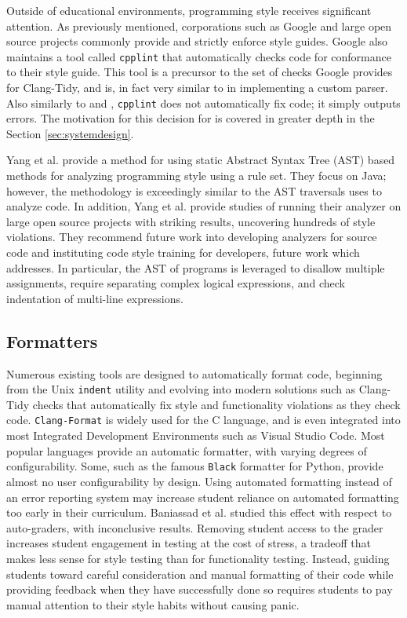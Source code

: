 \documentclass[sigconf]{acmart}
\begin{document}
Outside of educational environments, programming style receives significant attention.
As previously mentioned, corporations such as Google \cite{GoogleCStyleGuide} and large
open source projects commonly provide and strictly enforce style guides. Google also
maintains a tool called \texttt{cpplint} \cite{cpplint} that automatically checks code
for conformance to their style guide. This tool is a precursor to the set of checks
Google provides for Clang-Tidy, and is, in fact very similar to
\oldtool{} in implementing a custom parser. Also similarly to \oldtool{} and \tool{},
\texttt{cpplint} does not automatically fix code; it simply outputs errors. The motivation for
this decision for \tool{} is covered in greater depth in the
Section \ref{sec:systemdesign}.

Yang et al. \cite{10.1145/3297156.3297227} provide a method for using static Abstract Syntax Tree (AST) based methods
for analyzing programming style using a rule set. They focus on Java; however, the
methodology is exceedingly similar to the AST traversals
\tool{} uses to analyze code.
In addition, Yang et al. provide studies of running their analyzer on large open source
projects with striking results, uncovering hundreds of style violations. They recommend
future work into developing analyzers for source code and instituting code style
training for developers, future work which \tool{} addresses. In particular, 
the AST of programs is leveraged to disallow multiple assignments, require
separating complex logical expressions, and check indentation of multi-line expressions.

\subsection{Formatters}

Numerous existing tools are designed to automatically format code, beginning from the
Unix \texttt{indent} utility and evolving into modern solutions such as Clang-Tidy
checks that automatically fix style and functionality violations as they check code. 
\texttt{Clang-Format} \cite{ClangFormat} is widely used for the C language, and is even integrated into most
Integrated Development Environments such as Visual Studio Code. Most popular languages
provide an automatic formatter, with varying degrees of configurability. Some, such as the
famous  \texttt{Black} \cite{Black} formatter for Python, provide almost no user configurability
by design. Using automated formatting instead of an error reporting system may increase student
reliance on automated formatting too early in their curriculum. Baniassad et al. 
 \cite{baniassad_stop_2021} 
studied this effect with respect to auto-graders, with inconclusive results. Removing student access to the 
grader increases student engagement in testing at the cost of stress, a tradeoff that makes less sense 
for style testing than for functionality testing. Instead, guiding students toward
careful consideration and manual formatting of their code while providing feedback when they have 
successfully done so requires students to pay manual attention to their style habits without causing panic.
\end{document}
